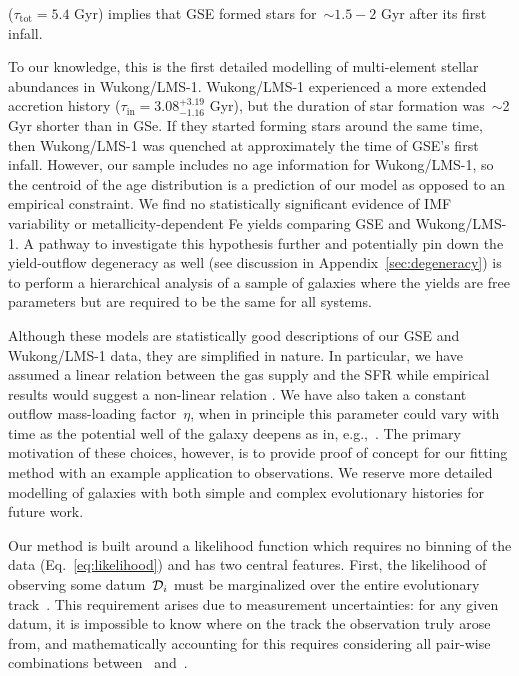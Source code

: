 ($\tau_\text{tot} = 5.4$ Gyr) implies that GSE formed stars for~$\sim$$1.5 - 2$
Gyr after its first infall.
\par
To our knowledge, this is the first detailed modelling of multi-element stellar
abundances in Wukong/LMS-1.
Wukong/LMS-1 experienced a more extended accretion history
($\tau_\text{in} = 3.08^{+3.19}_{-1.16}$ Gyr), but the duration of star
formation was~$\sim$2 Gyr shorter than in GSe.
If they started forming stars around the same time, then Wukong/LMS-1 was
quenched at approximately the time of GSE's first infall.
However, our sample includes no age information for Wukong/LMS-1, so the
centroid of the age distribution is a prediction of our model as opposed to an
empirical constraint.
We find no statistically significant evidence of IMF variability or
metallicity-dependent Fe yields comparing GSE and Wukong/LMS-1.
A pathway to investigate this hypothesis further and potentially pin down the
yield-outflow degeneracy as well (see discussion in
Appendix~\ref{sec:degeneracy}) is to perform a hierarchical analysis of a
sample of galaxies where the yields are free parameters but are required to be
the same for all systems.
\par
Although these models are statistically good descriptions of our GSE and
Wukong/LMS-1 data, they are simplified in nature.
In particular, we have assumed a linear relation between the gas supply and the
SFR while empirical results would suggest a non-linear relation
\citep[e.g.,][]{Kennicutt1998, Kennicutt2012, delosReyes2019, Kennicutt2021}.
We have also taken a constant outflow mass-loading factor~$\eta$, when in
principle this parameter could vary with time as the potential well of the
galaxy deepens as in, e.g.,~\citet{Conroy2022}.
The primary motivation of these choices, however, is to provide proof of
concept for our fitting method with an example application to observations.
We reserve more detailed modelling of galaxies with both simple and complex
evolutionary histories for future work.
\par
Our method is built around a likelihood function which requires no binning of
the data (Eq.~\ref{eq:likelihood}) and has two central features.
First, the likelihood of observing some datum~$\script{D}_i$ must be
marginalized over the entire evolutionary track~.
This requirement arises due to measurement uncertainties: for any given datum,
it is impossible to know where on the track the observation truly arose from,
and mathematically accounting for this requires considering all pair-wise
combinations between~ and~.
$$
